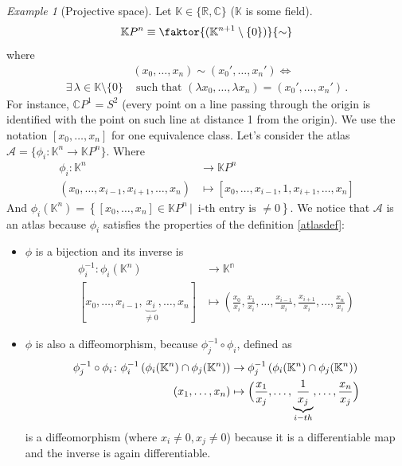 \documentclass[a4paper,11pt,titlepage, article, oneside]{memoir}
\numberwithin{equation}{section}
\theoremstyle{definition}
\theoremstyle{remark}
\newtheorem{example}[theorem]{Example}
\newcommand{\rfield}{\mathbb{R}}
\begin{document}
\begin{tcolorbox}\begin{example}[Projective space]
  Let $\mathbb{K} \in \{\rfield, \mathbb{C}\}$ ($\mathbb{K}$ is some field).
  $$\mathbb{K}P^n \equiv \faktor{(\mathbb{K}^{n+1} \setminus \{0\})}{\sim}$$
  where
  \begin{align*}&(x_0, \ldots, x_n) \sim (x_0', \ldots, x_n') \Longleftrightarrow \\
     \exists \, \lambda \in \mathbb{K}\setminus \{0\} &\text{ such that } (\lambda x_0, \ldots, \lambda x_n) = (x_0', \ldots, x_n') \, .
  \end{align*}
  For instance, $\mathbb{C}P^1 = S^2$ (every point on a line passing through the origin is identified with the point on such line at distance 1 from the origin). We use the notation $[x_0, \ldots, x_n]$ for one equivalence class.
  Let's consider the atlas $\mathcal{A} = \{\phi_i \colon \mathbb{K}^n \rightarrow \mathbb{K} P^n \}$. Where
  \begin{align*}
    \phi_i \colon \mathbb{K}^n &\rightarrow \mathbb{K}P^n \\
    (x_0, \ldots, x_{i-1}, x_{i+1}, \ldots, x_n) &\mapsto [x_0, \ldots, x_{i-1}, 1, x_{i+1}, \ldots, x_n]
  \end{align*}
  And $\phi_i(\mathbb{K}^n) = \left\{[x_0, \ldots, x_n] \in \mathbb{K}P^n \, | \, \text{ i-th entry is } \not = 0 \right \}$.
  We notice that $\mathcal{A}$ is an atlas because $\phi_i$ satisfies the properties of the definition \ref{atlasdef}:
  \begin{itemize}
    \item $\phi$ is a bijection and its inverse is
    \begin{align*}
      \phi_i^{-1} \colon \phi_i(\mathbb{K}^n) & \rightarrow \mathbb{K^n} \\
      [x_0, \ldots, x_{i-1}, \underbrace{x_i}_{\not = 0}, \ldots, x_n] &\mapsto \left( \frac{x_0}{x_i}, \frac{x_1}{x_i}, \ldots, \frac{x_{i-1}}{x_i}, \frac{x_{i+1}}{x_i}, \ldots, \frac{x_n}{x_i} \right)
    \end{align*}
    \item $\phi$ is also a diffeomorphism, because $\phi_j^{-1} \circ \phi_i$, defined as
    \begin{align*}
      \phi_j^{-1} \circ \phi_i \colon \phi_i^{-1} \left(\phi_i(\mathbb{K}^n) \cap \phi_j(\mathbb{K}^n) \right) &\rightarrow \phi_j^{-1} \left(\phi_i(\mathbb{K}^n) \cap \phi_j(\mathbb{K}^n) \right) \\
      (x_1, \ldots, x_n) &\mapsto \Bigl( \frac{x_1}{x_j}, \ldots, \underbrace{\frac{1}{x_j}}_{i-th}, \ldots, \frac{x_n}{x_j} \Bigr)
    \end{align*}
    is a diffeomorphism (where $x_i \not = 0, x_j \not = 0$) because it is a differentiable map and the inverse is again differentiable.
  \end{itemize}
\end{example}\end{tcolorbox}
\end{document}
